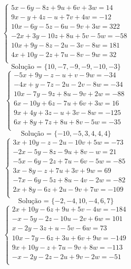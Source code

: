 \documentclass[12pt,oneside,a4paper]{article}
\begin{document}
\vspace{\baselineskip}
\begin{equation*}
\begin{cases}
5x-6y-8z+9u+6v+3w=14 \\
9x-y+4z-u+7v+4w=-12 \\
10x-6y-5z-6u-9v+3w=322 \\
-2x+3y-10z+8u+5v-5w=-58 \\
10x+9y-8z-2u-3v-8w=181 \\
4x+10y-2z+7u-8v-9w=32 \\
\end{cases}
\end{equation*}
\begin{equation*}
\text{Solução = }\{10,-7,-9,-9,-10,-3\}
\end{equation*}
\vspace{\baselineskip}
\begin{equation*}
\begin{cases}
-5x+9y-z-u+v-9w=-34 \\
-4x+y-7z-2u-2v-8w=-34 \\
10x-7y-9z+8u-9v+2w=-88 \\
6x-10y+6z-7u+6v+3w=16 \\
9x+4y+3z-u+3v-8w=-125 \\
6x+8y+7z+8u+8v-5w=-35 \\
\end{cases}
\end{equation*}
\begin{equation*}
\text{Solução = }\{-10,-5,3,4,4,4\}
\end{equation*}
\vspace{\baselineskip}
\begin{equation*}
\begin{cases}
3x+10y-z-2u-10v+5w=-73 \\
-2x-5y-8z-9u+8v-w=21 \\
-5x-6y-2z+7u-6v-5w=-85 \\
3x-8y-z+7u+3v+9w=69 \\
-7x-6y-5z+8u-4v-2w=-82 \\
2x+8y-6z+2u-9v+7w=-109 \\
\end{cases}
\end{equation*}
\begin{equation*}
\text{Solução = }\{-2,-4,10,-4,6,7\}
\end{equation*}
\vspace{\baselineskip}
\begin{equation*}
\begin{cases}
2x+10y-6z+9u+5v-4w=-184 \\
-x-5y-2z-10u-2v+6w=101 \\
x-2y-3z+u-5v-6w=73 \\
10x-7y-6z+3u+6v+9w=-149 \\
9x+10y-z+7u-9v+8w=-113 \\
-x-2y-2z-2u+9v-2w=-51 \\
\end{cases}
\end{equation*}
\end{document}
